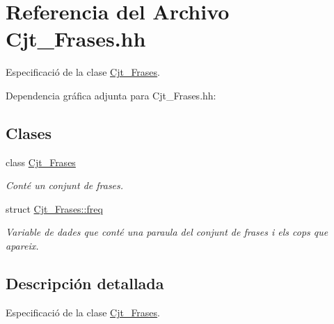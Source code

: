 \hypertarget{_cjt___frases_8hh}{}\section{Referencia del Archivo Cjt\+\_\+\+Frases.\+hh}
\label{_cjt___frases_8hh}


Especificació de la clase \hyperlink{class_cjt___frases}{Cjt\+\_\+\+Frases}.  


Dependencia gráfica adjunta para Cjt\+\_\+\+Frases.\+hh\+:
\subsection*{Clases}
\begin{DoxyCompactItemize}
\item 
class \hyperlink{class_cjt___frases}{Cjt\+\_\+\+Frases}
\begin{DoxyCompactList}\small\item\em Conté un conjunt de frases. \end{DoxyCompactList}\item 
struct \hyperlink{struct_cjt___frases_1_1freq}{Cjt\+\_\+\+Frases\+::freq}
\begin{DoxyCompactList}\small\item\em Variable de dades que conté una paraula del conjunt de frases i els cops que apareix. \end{DoxyCompactList}\end{DoxyCompactItemize}


\subsection{Descripción detallada}
Especificació de la clase \hyperlink{class_cjt___frases}{Cjt\+\_\+\+Frases}. 

